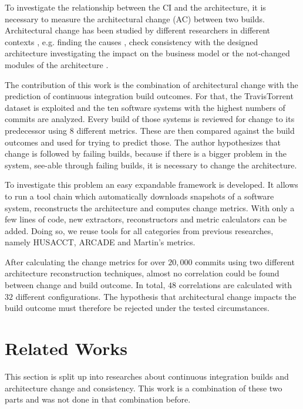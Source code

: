 \documentclass[conference]{IEEEtran}
\begin{document}
To investigate the relationship between the CI and the architecture, it is necessary to measure the architectural change (AC) between two builds. Architectural change has been studied by different researchers in different contexts \cite{Aramis,StructDist,Arc-MDSE,Arcade-Base} , e.g.  finding the causes \cite{AC-Causes}, check consistency with the designed architecture \cite{ArcConf, ArcCons} investigating the impact on the business model \cite{ArcChange-Business} or the not-changed modules of the architecture \cite{Knowledge-AC}. 

The contribution of this work is the combination of architectural change with the prediction of continuous integration build outcomes. For that, the TravisTorrent dataset is exploited and the ten software systems with the highest numbers of commits are analyzed. Every build of those systems is reviewed for change to its predecessor using 8 different metrics. These are then compared against the build outcomes and used for trying to predict those. The author hypothesizes that change is followed by failing builds, because if there is a bigger problem in the system, see-able through failing builds, it is necessary to change the architecture. 

To investigate this problem an easy expandable framework is developed. It allows to run a tool chain which automatically downloads snapshots of a software system, reconstructs the architecture and computes change metrics. With only a few lines of code, new extractors, reconstructors and metric calculators can be added. Doing so, we reuse tools for all categories from previous researches, namely HUSACCT, ARCADE and Martin's metrics.

After calculating the change metrics for over $20,000$ commits using two different architecture reconstruction techniques, almost no correlation could be found between change and build outcome. In total, $48$ correlations are calculated with $32$ different configurations. The hypothesis that architectural change impacts the build outcome must therefore be rejected under the tested circumstances. 

\section{Related Works}

This section is split up into researches about continuous integration builds and architecture change and consistency. This work is a combination of these two parts and was not done in that combination before. 
\end{document}
